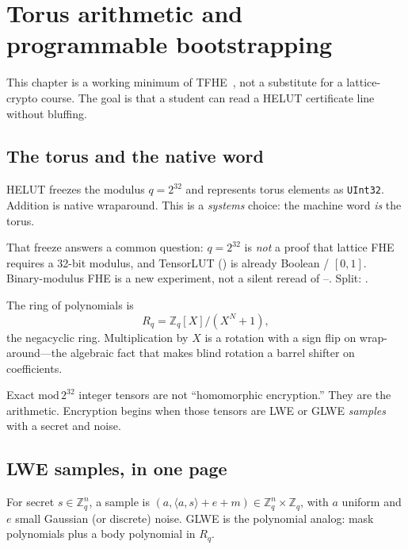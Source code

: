 \chapter{Torus arithmetic and programmable bootstrapping}
\label{ch:torus}

This chapter is a working minimum of TFHE~\cite{chillotti2020tfhe,ducas2015fhew},
not a substitute for a lattice-crypto course.
The goal is that a student can read a HELUT certificate line without bluffing.

\section{The torus and the native word}

\begin{definition}
HELUT freezes the modulus $q=2^{32}$ and represents torus elements as
\texttt{UInt32}. Addition is native wraparound. This is a \emph{systems}
choice: the machine word \emph{is} the torus.
\end{definition}

That freeze answers a common question: \(q=2^{32}\) is \emph{not} a proof that
lattice FHE requires a 32-bit modulus, and TensorLUT () is already
Boolean / \([0,1]\). Binary-modulus FHE is a new experiment, not a silent
reread of --. Split: .

The ring of polynomials is
\[
  R_q = \mathbb{Z}_q[X]/(X^N+1),
\]
the negacyclic ring. Multiplication by $X$ is a rotation with a sign flip on
wrap-around---the algebraic fact that makes blind rotation a barrel shifter
on coefficients.

\begin{warning}
Exact $\mathrm{mod}\,2^{32}$ integer tensors are not ``homomorphic encryption.''
They are the arithmetic. Encryption begins when those tensors are LWE or GLWE
\emph{samples} with a secret and noise.
\end{warning}

\section{LWE samples, in one page}

\begin{definition}
For secret $s\in\mathbb{Z}_q^n$, a sample is $(a,\langle a,s\rangle+e+m)\in\mathbb{Z}_q^n\times\mathbb{Z}_q$,
with $a$ uniform and $e$ small Gaussian (or discrete) noise.
GLWE is the polynomial analog: mask polynomials plus a body polynomial in $R_q$.
\end{definition}

